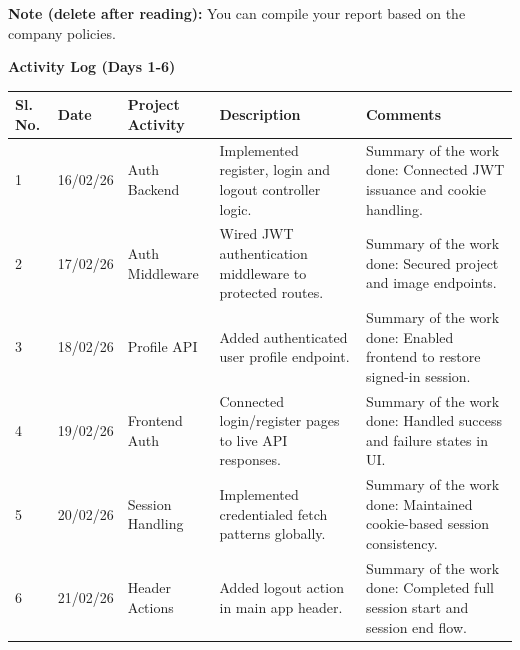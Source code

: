 \documentclass[12pt,a4paper]{article}
\begin{document}
{\color{red}\small\textbf{Note (delete after reading):} You can compile your report based on the company policies.}
\vspace{0.25cm}
\begin{center}{\large\bfseries Activity Log (Days 1-6)}\end{center}
\begin{tabular}{|p{}|p{}|p{}|p{}|p{}|}\hline
\centering\textbf{Sl. No.} & \centering\textbf{Date} & \centering\textbf{Project Activity} & \centering\textbf{Description} & \centering\textbf{Comments} \tabularnewline\hline
1 & 16/02/26 & Auth Backend & Implemented register, login and logout controller logic. &
Summary of the work done:\newline
Connected JWT issuance and cookie handling. \\ \hline
2 & 17/02/26 & Auth Middleware & Wired JWT authentication middleware to protected routes. &
Summary of the work done:\newline
Secured project and image endpoints. \\ \hline
3 & 18/02/26 & Profile API & Added authenticated user profile endpoint. &
Summary of the work done:\newline
Enabled frontend to restore signed-in session. \\ \hline
4 & 19/02/26 & Frontend Auth & Connected login/register pages to live API responses. &
Summary of the work done:\newline
Handled success and failure states in UI. \\ \hline
5 & 20/02/26 & Session Handling & Implemented credentialed fetch patterns globally. &
Summary of the work done:\newline
Maintained cookie-based session consistency. \\ \hline
6 & 21/02/26 & Header Actions & Added logout action in main app header. &
Summary of the work done:\newline
Completed full session start and session end flow. \\ \hline
\end{tabular}

\newpage
\end{document}
